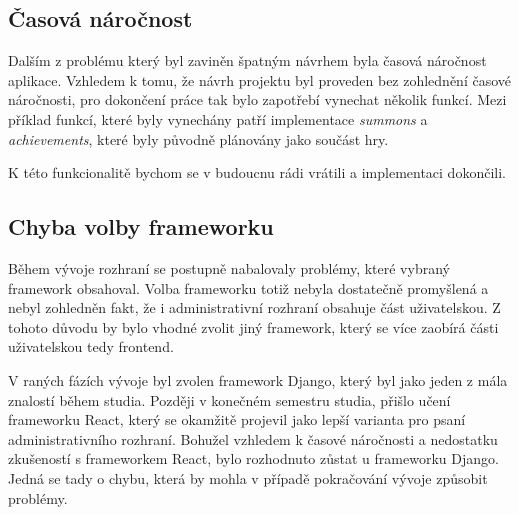 \subsection*{Časová náročnost}
\label{subsec:implementation-problems-time}
Dalším z problému který byl zaviněn špatným návrhem byla časová náročnost aplikace. Vzhledem k tomu, že návrh projektu byl proveden bez zohlednění časové náročnosti, pro dokončení práce tak bylo zapotřebí vynechat několik funkcí. Mezi příklad funkcí, které byly vynechány patří implementace \textit{summons} a \textit{achievements}, které byly původně plánovány jako součást hry.

K této funkcionalitě bychom se v budoucnu rádi vrátili a implementaci dokončili.

\subsection*{Chyba volby frameworku}
\label{subsec:implementation-problems-framework}
Během vývoje rozhraní se postupně nabalovaly problémy, které vybraný framework obsahoval. Volba frameworku totiž nebyla dostatečně promyšlená a nebyl zohledněn fakt, že i administrativní rozhraní obsahuje část uživatelskou. Z tohoto důvodu by bylo vhodné zvolit jiný framework, který se více zaobírá části uživatelskou tedy frontend.

V raných fázích vývoje byl zvolen framework Django, který byl jako jeden z mála znalostí během studia. Později v konečném semestru studia, přišlo učení frameworku React, který se okamžitě projevil jako lepší varianta pro psaní administrativního rozhraní. Bohužel vzhledem k časové náročnosti a nedostatku zkušeností s frameworkem React, bylo rozhodnuto zůstat u frameworku Django. Jedná se tady o chybu, která by mohla v případě pokračování vývoje způsobit problémy.

\endinput